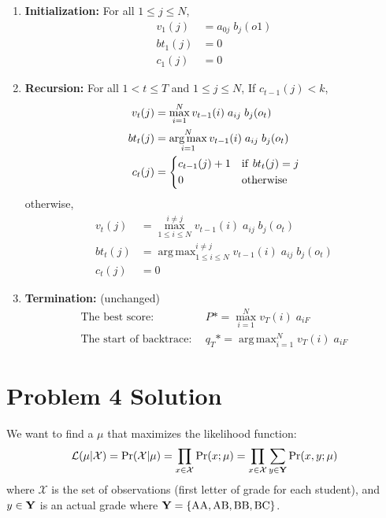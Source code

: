 \documentclass[11pt,a4paper,titlepage]{article}
\DeclareMathOperator*{\argmax}{arg\,max} %
\begin{document}
\begin{enumerate}
    \item \textbf{Initialization:} For all $1 \le j \le N$,
        \begin{align*}
            v_1(j) &= a_{0j} \; b_j(o1) \\
            bt_1(j) &= 0 \\
            c_1(j) &= 0
        \end{align*}
    \item \textbf{Recursion:} For all $1 < t \le T$ and $1 \le j \le N$,
        If $c_{t-1}(j) < k$,
        \begin{align*}
            v_t(j) &= \max_{i=1}^{N} v_{t-1}(i) \; a_{ij} \; b_j(o_t) \\
            bt_t(j) &= \argmax_{i=1}^{N} v_{t-1}(i) \; a_{ij} \; b_j(o_t) \\
            c_t(j) &=
            \begin{dcases}
                c_{t-1}(j) + 1 & {\rm if~} bt_t(j) = j \\
                0 & {\rm otherwise} \\
            \end{dcases}
        \end{align*}
        otherwise,
        \begin{align*}
            v_t(j) &= \max_{1 \le i \le N}^{i \ne j} v_{t-1}(i) \; a_{ij} \; b_j(o_t) \\
            bt_t(j) &= \argmax_{1 \le i \le N}^{i \ne j} v_{t-1}(i) \; a_{ij} \; b_j(o_t) \\
            c_t(j) &= 0
        \end{align*}
    \item \textbf{Termination:} (unchanged)
        \begin{align*}
            \textrm{The best score:}&~~ P* = \max_{i=1}^N v_T(i) \; a_{iF} \\
            \textrm{The start of backtrace:}&~~ q_T* = \argmax_{i=1}^N v_T(i) \; a_{iF}
        \end{align*}
\end{enumerate}


\section*{Problem 4 Solution}

We want to find a $\mu$ that maximizes the likelihood function:
\[
    \mathcal{L}(\mu | \mathcal{X}) = \Pr(\mathcal{X} | \mu)
                                   = \prod_{x \in \mathcal{X}} \Pr(x; \mu)
                                   = \prod_{x \in \mathcal{X}} \sum_{y \in \rm\bf Y} \Pr(x, y; \mu)
\]
where $\mathcal{X}$ is the set of observations (first letter of grade for each
student), and $y \in \bf Y$ is an actual grade where $\mathbf{Y} = \{\rm AA, AB, BB, BC \}$.
\end{document}
